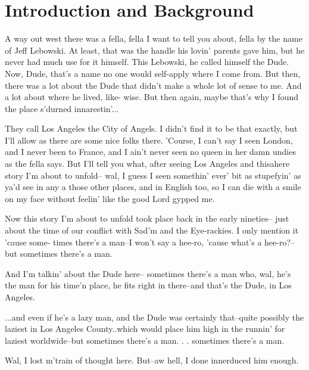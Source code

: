 \chapter{Introduction and Background}

A way out west there was a fella, 
fella I want to tell you about, fella 
by the name of Jeff Lebowski. At 
least, that was the handle his lovin' 
parents gave him, but he never had 
much use for it himself. This 
Lebowski, he called himself the Dude. 
Now, Dude, that's a name no one would 
self-apply where I come from. But 
then, there was a lot about the Dude 
that didn't make a whole lot of sense 
to me. And a lot about where he 
lived, like- wise. But then again, 
maybe that's why I found the place 
s'durned innarestin'...

They call Los Angeles the City of 
Angels. I didn't find it to be that 
exactly, but I'll allow as there are 
some nice folks there. 'Course, I 
can't say I seen London, and I never 
been to France, and I ain't never 
seen no queen in her damn undies as 
the fella says. But I'll tell you 
what, after seeing Los Angeles and 
thisahere story I'm about to unfold--
wal, I guess I seen somethin' ever' 
bit as stupefyin' as ya'd see in any 
a those other places, and in English 
too, so I can die with a smile on my 
face without feelin' like the good 
Lord gypped me.

Now this story I'm about to unfold 
took place back in the early nineties--
just about the time of our conflict 
with Sad'm and the Eye-rackies. I 
only mention it 'cause some- times 
there's a man--I won't say a hee-ro, 
'cause what's a hee-ro?--but sometimes 
there's a man.

And I'm talkin' about the Dude here-- 
sometimes there's a man who, wal, 
he's the man for his time'n place, 
he fits right in there--and that's 
the Dude, in Los Angeles.

...and even if he's a lazy man, and 
the Dude was certainly that--quite 
possibly the laziest in Los Angeles 
County..which would place him high in the 
runnin' for laziest worldwide--but 
sometimes there's a man. . . sometimes 
there's a man.

Wal, I lost m'train of thought here. 
But--aw hell, I done innerduced him 
enough.
